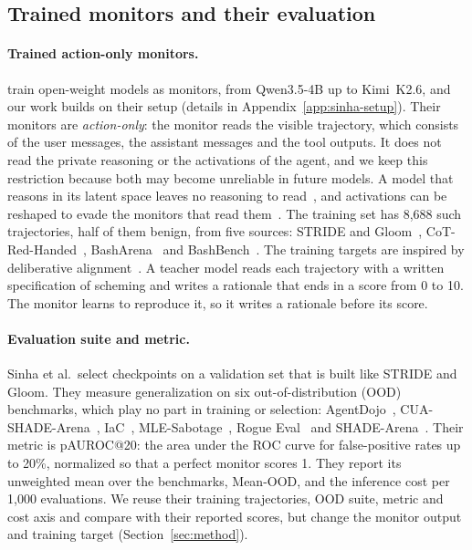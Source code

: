 \subsection{Trained monitors and their evaluation}
\label{sec:background-sinha}

\paragraph{Trained action-only monitors.}
\citet{sinha2026training} train open-weight models as monitors, from Qwen3.5-4B up to Kimi~K2.6, and our work builds on their setup (details in Appendix~\ref{app:sinha-setup}).
Their monitors are \emph{action-only}: the monitor reads the visible trajectory, which consists of the user messages, the assistant messages and the tool outputs.
It does not read the private reasoning or the activations of the agent, and we keep this restriction because both may become unreliable in future models.
A model that reasons in its latent space leaves no reasoning to read~\citep{korbak2025chain}, and activations can be reshaped to evade the monitors that read them~\citep{bailey2024obfuscated}.
The training set has 8,688 such trajectories, half of them benign, from five sources: STRIDE and Gloom~\citep{storf2026constitutional}, CoT-Red-Handed~\citep{arnav2025cot}, BashArena~\citep{kaufman2025basharena} and BashBench~\citep{bhatt2025ctrlz}.
The training targets are inspired by deliberative alignment~\citep{guan2024deliberative}.
A teacher model reads each trajectory with a written specification of scheming and writes a rationale that ends in a score from 0 to 10.
The monitor learns to reproduce it, so it writes a rationale before its score.

\paragraph{Evaluation suite and metric.}
Sinha et al.\ select checkpoints on a validation set that is built like STRIDE and Gloom.
They measure generalization on six out-of-distribution (OOD) benchmarks, which play no part in training or selection: AgentDojo~\citep{debenedetti2024agentdojo}, CUA-SHADE-Arena~\citep{kale2025reliable}, IaC~\citep{controlarena2025iac}, MLE-Sabotage~\citep{ward2025ctrl}, Rogue Eval~\citep{roger2024rogue} and SHADE-Arena~\citep{kutasov2025shade}.
Their metric is pAUROC@20: the area under the ROC curve for false-positive rates up to 20\%, normalized so that a perfect monitor scores 1.
They report its unweighted mean over the benchmarks, Mean-OOD, and the inference cost per 1,000 evaluations.
We reuse their training trajectories, OOD suite, metric and cost axis and compare with their reported scores, but change the monitor output and training target (Section~\ref{sec:method}).

